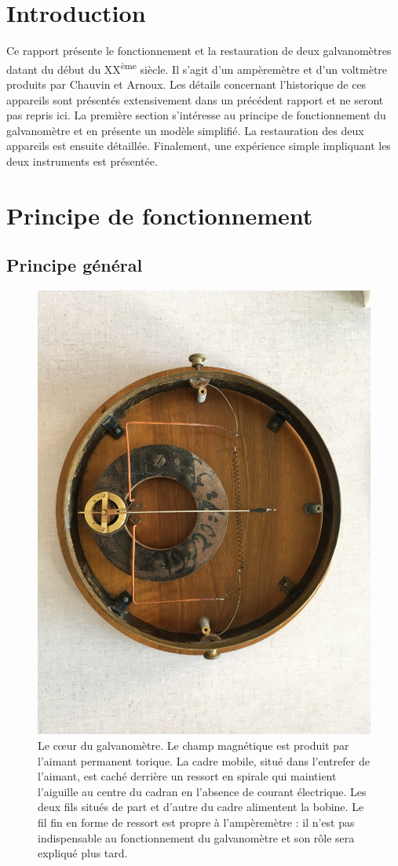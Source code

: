 \documentclass[12pt,a4paper,fleqn]{article}
\begin{document}

\newpage

\tableofcontents
\newpage



\section*{Introduction}

Ce rapport présente le fonctionnement et la restauration de deux galvanomètres datant du début du XX\textsuperscript{ème} siècle.
Il s'agit d'un ampèremètre et d'un voltmètre produits par Chauvin et Arnoux.
Les détails concernant l'historique de ces appareils sont présentés extensivement dans un précédent rapport \cite{Ardellier2016} et ne seront pas repris ici.
La première section s'intéresse au principe de fonctionnement du galvanomètre et en présente un modèle simplifié.
La restauration des deux appareils est ensuite détaillée.
Finalement, une expérience simple impliquant les deux instruments est présentée.


\section{Principe de fonctionnement}

\subsection{Principe général}

\begin{figure}[htbp]
    \center
    \includegraphics[trim=1300 300 1300 800, clip, width=.5\linewidth]{images/IMG_4037.JPG}
    \caption{
    Le \og cœur \fg{} du galvanomètre.
    Le champ magnétique est produit par l'aimant permanent torique.
    La cadre mobile, situé dans l'entrefer de l'aimant, est caché derrière un ressort en spirale qui maintient l'aiguille au centre du cadran en l'absence de courant électrique.
    Les deux fils situés de part et d'autre du cadre alimentent la bobine.
    Le fil fin en forme de ressort est propre à l'ampèremètre : il n'est pas indispensable au fonctionnement du galvanomètre et son rôle sera expliqué plus tard.}
    \label{fig:principe}
\end{figure}
\end{document}
